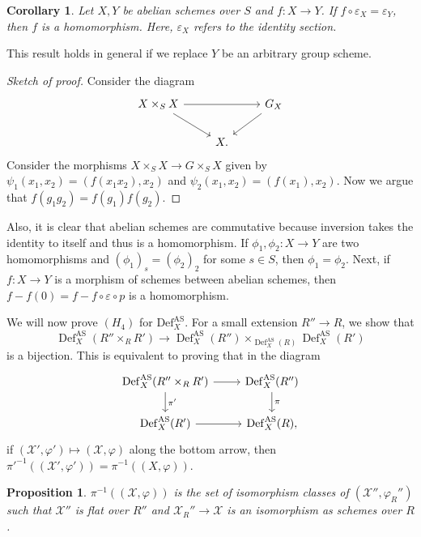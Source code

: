 \documentclass[leqno, openany]{memoir}
\newtheorem{cor}[thm]{Corollary}
\newtheorem{prop}[thm]{Proposition}
\theoremstyle{definition}
\theoremstyle{remark}
\theoremstyle{plain}
\theoremstyle{definition}
\theoremstyle{remark}
\newcommand{\ep}{\varepsilon}
\newcommand{\mc}[1]{\mathcal{#1}}
\newcommand{\mr}[1]{\mathrm{#1}}
\DeclareMathOperator{\Def}{Def}
\begin{document}
\begin{cor}
    Let $X, Y$ be abelian schemes over $S$ and $f \colon X \to Y$. If $f \circ \ep_X = \ep_Y$, then $f$ is a homomorphism. Here, $\ep_X$ refers to the identity section.
\end{cor}

This result holds in general if we replace $Y$ be an arbitrary group scheme.

\begin{proof}[Sketch of proof]
    Consider the diagram
    \begin{equation*}
    \begin{tikzcd}
        X \times_S X \ar{rr} \ar{dr} && G_X \ar{dl} \\
        & X.
    \end{tikzcd}
    \end{equation*}
    Consider the morphisms $X \times_S X \to G \times_S X$ given by $\psi_1(x_1, x_2) = (f(x_1x_2), x_2)$ and $\psi_2(x_1, x_2) = (f(x_1), x_2)$. Now we argue that $f(g_1 g_2) = f(g_1) f(g_2)$.
\end{proof}

Also, it is clear that abelian schemes are commutative because inversion takes the identity to itself and thus is a homomorphism. If $\phi_1, \phi_2 \colon X \to Y$ are two homomorphisms and $(\phi_1)_s = (\phi_2)_2$ for some $s \in S$, then $\phi_1 = \phi_2$. Next, if $f \colon X \to Y$ is a morphism of schemes between abelian schemes, then $f - f(0) = f - f \circ \ep \circ p$ is a homomorphism.

We will now prove $(H_4)$ for $\mr{Def}_X^{\mr{AS}}$. For a small extension $R'' \to R$, we show that
\[ \Def_X^{\mr{AS}} (R'' \times_R R') \to \Def_X^{\mr{AS}}(R'') \times_{\Def_X^{\mr{AS}}(R)} \Def_X^{\mr{AS}}(R') \]
is a bijection. This is equivalent to proving that in the diagram
\begin{equation*}
\begin{tikzcd}
    \Def_X^{\mr{AS}}(R'' \times_R R') \ar{r} \ar{d}{\pi'} & \Def_X^{\mr{AS}}(R'') \ar{d}{\pi} \\
    \Def_X^{\mr{AS}}(R') \ar{r} & \Def_X^{\mr{AS}}(R),
\end{tikzcd}
\end{equation*}
if $(\mc{X}', \varphi') \mapsto (\mc{X}, \varphi)$ along the bottom arrow, then $\pi'^{-1}((\mc{X}', \varphi')) = \pi^{-1}((X, \varphi))$.

\begin{prop}
    $\pi^{-1}((\mc{X}, \varphi))$ is the set of isomorphism classes of $(\mc{X}'', \varphi_R'')$ such that $\mc{X}''$ is flat over $R''$ and $\mc{X}_R'' \to \mc{X}$ is an isomorphism as schemes over $R$.
\end{prop}
\end{document}
